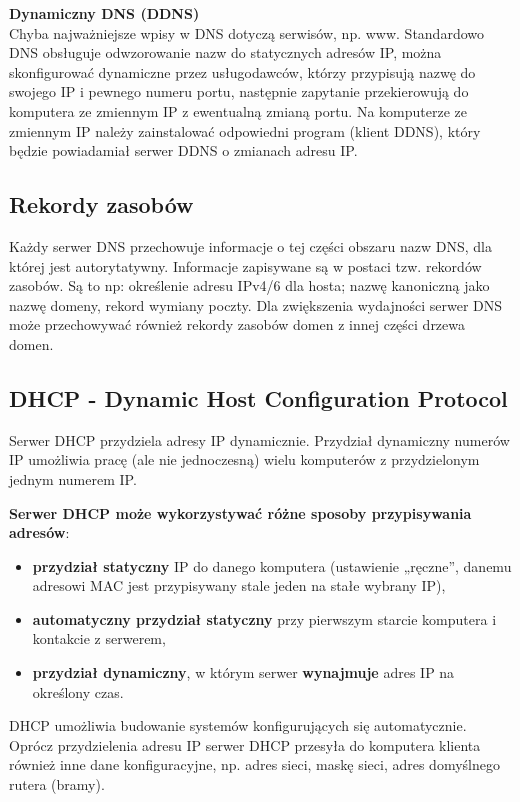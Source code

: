 \documentclass[../main.tex]{subfiles}
\begin{document}
    \textbf{Dynamiczny DNS (DDNS)}\\
    Chyba najważniejsze wpisy w DNS dotyczą serwisów, np. www. Standardowo DNS obsługuje
    odwzorowanie nazw do statycznych adresów IP, można skonfigurować dynamiczne przez usługodawców,
    którzy przypisują nazwę do swojego IP i pewnego numeru portu, następnie zapytanie
    przekierowują do komputera ze zmiennym IP z ewentualną zmianą portu. Na komputerze ze zmiennym IP należy
    zainstalować odpowiedni program (klient DDNS), który będzie powiadamiał serwer DDNS o
    zmianach adresu IP.

    \subsection{Rekordy zasobów}
    Każdy serwer DNS przechowuje informacje o tej części obszaru nazw DNS, dla której jest
    autorytatywny. Informacje
    zapisywane są w postaci tzw. rekordów zasobów. Są to np: określenie adresu IPv4/6 dla hosta; nazwę kanoniczną jako nazwę domeny,
    rekord wymiany poczty.
    Dla zwiększenia wydajności serwer DNS może przechowywać również rekordy zasobów
    domen z innej części drzewa domen.

    \subsection{DHCP - Dynamic Host Configuration Protocol}
    Serwer DHCP przydziela adresy IP dynamicznie.
    Przydział dynamiczny numerów IP umożliwia pracę (ale nie jednoczesną) wielu komputerów z
    przydzielonym jednym numerem IP.

    \textbf{Serwer DHCP może wykorzystywać różne sposoby przypisywania adresów}:
    \begin{itemize}
        \item \textbf{przydział statyczny} IP do danego komputera (ustawienie „ręczne”, danemu adresowi
        MAC jest przypisywany stale jeden na stałe wybrany IP),
        \item \textbf{automatyczny przydział statyczny} przy pierwszym starcie komputera i kontakcie z
        serwerem,
        \item \textbf{przydział dynamiczny}, w którym serwer \textbf{wynajmuje} adres IP na określony czas.
    \end{itemize}
    DHCP umożliwia budowanie systemów konfigurujących się automatycznie.
    Oprócz przydzielenia adresu IP serwer DHCP przesyła do komputera klienta również inne
    dane konfiguracyjne, np. adres sieci, maskę sieci, adres domyślnego rutera (bramy).
\end{document}
